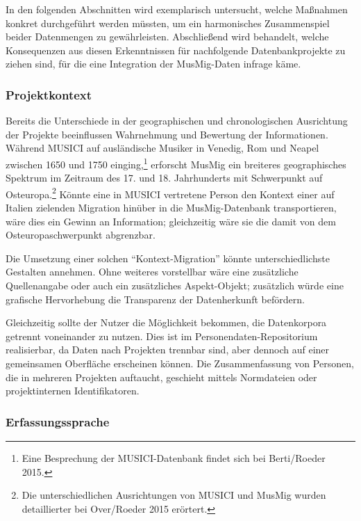 \documentclass[a4paper,
fontsize=11pt,
oneside,
numbers=noperiodatend,
parskip=half-,
bibliography=totoc,
final
]{scrartcl}
\begin{document}
In den folgenden Abschnitten wird exemplarisch untersucht, welche
Maßnahmen konkret durchgeführt werden müssten, um ein harmonisches
Zusammenspiel beider Datenmengen zu gewährleisten. Abschließend wird
behandelt, welche Konsequenzen aus diesen Erkenntnissen für nachfolgende
Datenbankprojekte zu ziehen sind, für die eine Integration der
MusMig-Daten infrage käme.

\subsubsection*{Projektkontext}\label{projektkontext}

Bereits die Unterschiede in der geographischen und chronologischen
Ausrichtung der Projekte beeinflussen Wahrnehmung und Bewertung der
Informationen. Während MUSICI auf ausländische Musiker in Venedig, Rom
und Neapel zwischen 1650 und 1750 einging,\footnote{Eine Besprechung der
  MUSICI-Daten\-bank findet sich bei Berti/Roeder 2015.} erforscht MusMig
ein breiteres geographisches Spektrum im Zeitraum des 17. und 18.
Jahrhunderts mit Schwerpunkt auf Osteuropa.\footnote{Die
  unterschiedlichen Ausrichtungen von MUSICI und MusMig wurden
  detaillierter bei Over/Roeder 2015 erörtert.} Könnte eine in MUSICI
vertretene Person den Kontext einer auf Italien zielenden Migration
hinüber in die MusMig-Datenbank transportieren, wäre dies ein Gewinn an
Information; gleichzeitig wäre sie die damit von dem
Osteuropaschwerpunkt abgrenzbar.

Die Umsetzung einer solchen \enquote{Kontext-Migration} könnte
unterschiedlichste Gestalten annehmen. Ohne weiteres vorstellbar wäre
eine zusätzliche Quellenangabe oder auch ein zusätzliches Aspekt-Objekt;
zusätzlich würde eine grafische Hervorhebung die Transparenz der
Datenherkunft befördern.

Gleichzeitig sollte der Nutzer die Möglichkeit bekommen, die
Datenkorpora getrennt voneinander zu nutzen. Dies ist im
Personendaten-Repositorium realisierbar, da Daten nach Projekten
trennbar sind, aber dennoch auf einer gemeinsamen Oberfläche erscheinen
können. Die Zusammenfassung von Personen, die in mehreren Projekten
auftaucht, geschieht mittels Normdateien oder projektinternen
Identifikatoren.

\subsubsection*{Erfassungssprache}\label{erfassungssprache}
\end{document}
